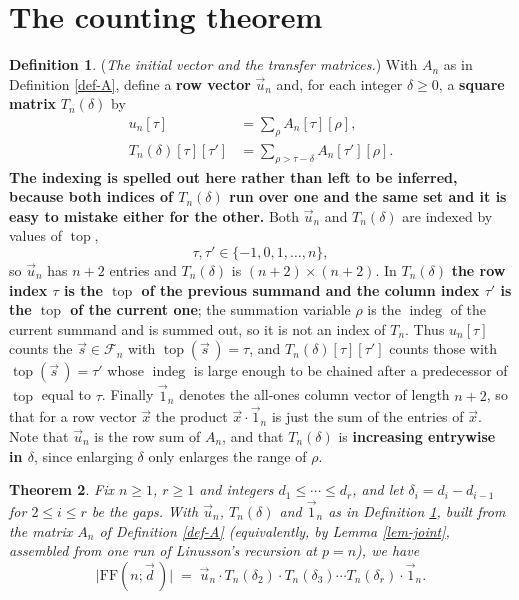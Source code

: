 \documentclass[11pt, a4paper, abstract=yes]{scrartcl}
\theoremstyle{definition}
\newtheorem{definition}{Definition}
\theoremstyle{remark}
\theoremstyle{plain}
\newtheorem{theorem}[definition]{Theorem}
\newcommand{\indeg}{\operatorname{indeg}}
\newcommand{\tp}{\operatorname{top}}
\begin{document}
\section{The counting theorem}
\label{sec-main}
\begin{definition}
(\emph{The initial vector and the transfer matrices.}) With \(A_n\) as in Definition \ref{def-A}, define a
\textbf{row vector} \(\vec u_n\) and, for each integer \(\delta\ge0\), a \textbf{square matrix} \(T_n(\delta)\) by
\begin{align}
  u_n[\tau] &= \sum_{\rho}A_n[\tau][\rho],\label{eq:def-u}\\
  T_n(\delta)[\tau][\tau'] &= \sum_{\rho>\tau-\delta}A_n[\tau'][\rho].\label{eq:def-T}
\end{align}
\textbf{The indexing is spelled out here rather than left to be inferred, because both indices of
\(T_n(\delta)\) run over one and the same set and it is easy to mistake either for the other.} Both
\(\vec u_n\) and \(T_n(\delta)\) are indexed by values of \(\tp\),
\begin{equation}\label{eq:def-uT-range}
  \tau,\tau'\in\lbrace-1,0,1,\dots,n\rbrace ,
\end{equation}
so \(\vec u_n\) has \(n+2\) entries and \(T_n(\delta)\) is \((n+2)\times(n+2)\). In \(T_n(\delta)\) \textbf{the row
index \(\tau\) is the \(\tp\) of the previous summand and the column index \(\tau'\) is the \(\tp\) of
the current one}; the summation variable \(\rho\) is the \(\indeg\) of the current summand and is
summed out, so it is not an index of \(T_n\). Thus \(u_n[\tau]\) counts the \(\vec s\in\mathcal F_n\)
with \(\tp(\vec s\,)=\tau\), and \(T_n(\delta)[\tau][\tau']\) counts those with \(\tp(\vec s\,)=\tau'\)
whose \(\indeg\) is large enough to be chained after a predecessor of \(\tp\) equal to \(\tau\).
Finally \(\vec 1_n\) denotes the all-ones column vector of length \(n+2\), so that for a row vector
\(\vec x\) the product \(\vec x\cdot\vec 1_n\) is just the sum of the entries of \(\vec x\). Note
that \(\vec u_n\) is the row sum of
\(A_n\), and that \(T_n(\delta)\) is \textbf{increasing entrywise in \(\delta\)}, since enlarging \(\delta\)
only enlarges the range of \(\rho\).
\label{def-uT}
\end{definition}

\begin{theorem}
Fix \(n\ge1\), \(r\ge1\) and integers \(d_1\le\cdots\le d_r\), and let \(\delta_i=d_i-d_{i-1}\) for
\(2\le i\le r\) be the gaps. With \(\vec u_n\), \(T_n(\delta)\) and \(\vec 1_n\) as in
Definition \ref{def-uT}, built from the matrix \(A_n\) of Definition \ref{def-A} (equivalently, by
Lemma \ref{lem-joint}, assembled from one run of Linusson's recursion at \(p=n\)), we have
\begin{equation}\label{eq:auto-15}
  \lvert\mathrm{FF}(n;\vec d\,)\rvert\;=\;\vec u_n\cdot T_n(\delta_2)\cdot T_n(\delta_3)\cdots T_n(\delta_r)\cdot\vec 1_n .
\end{equation}
\label{thm-main}
\end{theorem}
\end{document}
